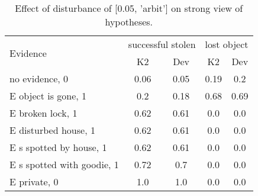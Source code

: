 \begin{table}\begin{tabular}{l|cc|cc}\toprule\multirow{2}{*}{Evidence} & \multicolumn{2}{c}{successful stolen}& \multicolumn{2}{c}{lost object}\\& {K2} & {Dev}& {K2} & {Dev}\\\midrule
no evidence, 0 & 0.06&0.05&0.19&0.2\\E object is gone, 1 & 0.2&0.18&0.68&0.69\\E broken lock, 1 & 0.62&0.61&0.0&0.0\\E disturbed house, 1 & 0.62&0.61&0.0&0.0\\E s spotted by house, 1 & 0.62&0.61&0.0&0.0\\E s spotted with goodie, 1 & 0.72&0.7&0.0&0.0\\E private, 0 & 1.0&1.0&0.0&0.0\\\bottomrule\end{tabular}\caption{Effect of disturbance of [0.05, 'arbit'] on strong view of hypotheses.}\end{table}